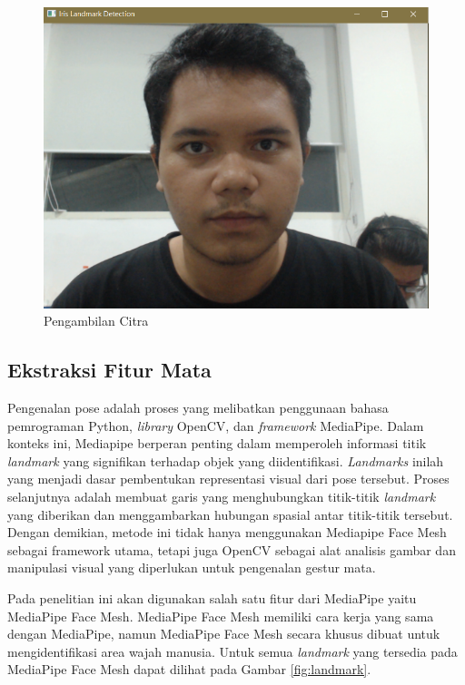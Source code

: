 \begin{figure} [H] \centering
  \includegraphics[scale=0.35]{gambar/bab3/citra.png}
  \caption{Pengambilan Citra}
  \label{fig:citra}
\end{figure}

\subsection{Ekstraksi Fitur Mata}
Pengenalan pose adalah proses yang melibatkan penggunaan bahasa pemrograman Python, \emph{library} OpenCV, dan \emph{framework} MediaPipe. Dalam konteks ini, Mediapipe berperan penting dalam memperoleh informasi titik \emph{landmark} yang signifikan terhadap objek yang diidentifikasi. \emph{Landmarks} inilah yang menjadi dasar pembentukan representasi visual dari pose tersebut. Proses selanjutnya adalah membuat garis yang menghubungkan titik-titik \emph{landmark} yang diberikan dan menggambarkan hubungan spasial antar titik-titik tersebut. Dengan demikian, metode ini tidak hanya menggunakan Mediapipe Face Mesh sebagai framework utama, tetapi juga  OpenCV sebagai alat analisis gambar dan manipulasi visual yang diperlukan untuk pengenalan gestur mata.

Pada penelitian ini akan digunakan salah satu fitur dari MediaPipe yaitu MediaPipe Face Mesh. MediaPipe Face Mesh memiliki cara kerja yang sama dengan MediaPipe, namun MediaPipe Face Mesh secara khusus dibuat untuk mengidentifikasi area wajah manusia. Untuk semua \textit{landmark} yang tersedia pada MediaPipe Face Mesh dapat dilihat pada Gambar \ref{fig:landmark}.

